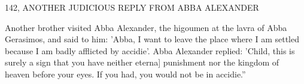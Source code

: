 142, ANOTHER JUDICIOUS REPLY
FROM ABBA ALEXANDER

Another brother visited Abba Alexander, the higoumen at the lavra
of Abba Gerasimos, and said to him: 'Abba, I want to leave the
place where I am settled because I am badly afflicted by accidie'.
Abba Alexander replied: 'Child, this is surely a sign that you have
neither eterna] punishment nor the kingdom of heaven before your
eyes.
If you had, you would not be in accidie.”

